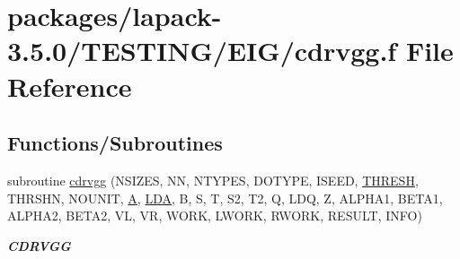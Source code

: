 \hypertarget{cdrvgg_8f}{}\section{packages/lapack-\/3.5.0/\+T\+E\+S\+T\+I\+N\+G/\+E\+I\+G/cdrvgg.f File Reference}
\label{cdrvgg_8f}
\subsection*{Functions/\+Subroutines}
\begin{DoxyCompactItemize}
\item 
subroutine \hyperlink{group__complex__eig_ga6d4d21e3f556cbcb6998be9aeede7151}{cdrvgg} (N\+S\+I\+Z\+E\+S, N\+N, N\+T\+Y\+P\+E\+S, D\+O\+T\+Y\+P\+E, I\+S\+E\+E\+D, \hyperlink{zlaqgs_8c_a0656018abfc9fa2821827415f5d5ea57}{T\+H\+R\+E\+S\+H}, T\+H\+R\+S\+H\+N, N\+O\+U\+N\+I\+T, \hyperlink{classA}{A}, \hyperlink{example__user_8c_ae946da542ce0db94dced19b2ecefd1aa}{L\+D\+A}, B, S, T, S2, T2, Q, L\+D\+Q, Z, A\+L\+P\+H\+A1, B\+E\+T\+A1, A\+L\+P\+H\+A2, B\+E\+T\+A2, V\+L, V\+R, W\+O\+R\+K, L\+W\+O\+R\+K, R\+W\+O\+R\+K, R\+E\+S\+U\+L\+T, I\+N\+F\+O)
\begin{DoxyCompactList}\small\item\em {\bfseries C\+D\+R\+V\+G\+G} \end{DoxyCompactList}\end{DoxyCompactItemize}
